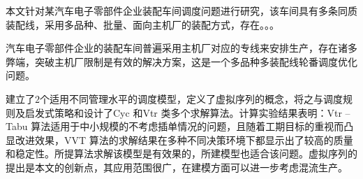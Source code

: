 本文针对某汽车电子零部件企业装配车间调度问题进行研究，该车间具有多条同质装配线，采用多品种、批量、面向主机厂的装配方式，存在。。。


汽车电子零部件企业的装配车间普遍采用主机厂对应的专线来安排生产，存在诸多弊端，突破主机厂限制是有效的解决方案，这是一个多品种多装配线轮番调度优化问题。

建立了$2$个适用不同管理水平的调度模型，定义了虚拟序列的概念，将之与调度规则及启发式策略和设计了Cyc 和Vtr 类多个求解算法。计算实验结果表明：Vtr -- Tabu 算法适用于中小规模的不考虑插单情况的问题，且随着工期目标的重视而凸显改进效果，VVT 算法的求解结果在多种不同决策环境下都显示出了较高的质量和稳定性。所提算法求解该模型是有效果的，所建模型也适合该问题。虚拟序列的提出是本文的创新点，其应用范围很广，在建模方面可以进一步考虑混流生产。

